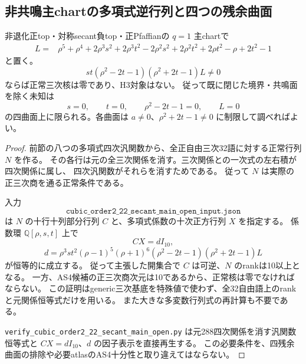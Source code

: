 \subsection{非共鳴主chartの多項式逆行列と四つの残余曲面}
\begin{proposition}
非退化正top・対称secant負top・正Pfaffianの $q=1$ 主chartで
\begin{align*}
 L={}&\rho^5+\rho^4+2\rho^3s^2+2\rho^3t^2-2\rho^2s^2
       +2\rho^2t^2+2\rho t^2-\rho+2t^2-1
\end{align*}
と置く。
\[
 s t(\rho^2-2t-1)(\rho^2+2t-1)L\ne0
\]
ならば正常三次核は零であり、H3対象はない。
従って既に閉じた境界・共鳴面を除く未知は
\[
 s=0,\qquad t=0,\qquad\rho^2-2t-1=0,\qquad L=0
\]
の四曲面上に限られる。各曲面は $a\ne0$、$\rho^2+2t-1\ne0$ に制限して調べればよい。
\end{proposition}
\begin{proof}
前節の八つの多項式四次汎関数から、全正自由三次32語に対する正常行列 $N$ を作る。
その各行は元の全三次関係を消す。三次関係との一次式の左右積が四次関係に属し、
四次汎関数がそれらを消すためである。
従って $N$ は実際の正三次商を通る正常条件である。

入力
\[
 \texttt{cubic\_order2\_22\_secant\_main\_open\_input.json}
\]
は $N$ の十行十列部分行列 $C$ と、多項式係数の十次正方行列 $X$ を指定する。
係数環 $\mathbb Q[\rho,s,t]$ 上で
\[
 C X=dI_{10},
\]
\[
 d=\rho^3 s t^2(\rho-1)^5(\rho+1)^6
       (\rho^2-2t-1)(\rho^2+2t-1)L
\]
が恒等的に成立する。
従って主張した開集合で $C$ は可逆、$N$ のrankは10以上となる。
一方、AS4候補の正三次商次元は10であるから、正常核は零でなければならない。
この証明はgeneric三次基底を特殊値で使わず、全32自由語上のrankと元関係恒等式だけを用いる。
また大きな多変数行列式の再計算も不要である。

\texttt{verify\_cubic\_order2\_22\_secant\_main\_open.py}
は元288四次関係を消す汎関数恒等式と $CX=dI_{10}$、$d$ の因子表示を直接再生する。
この必要条件を、四残余曲面の排除や必要atlasのAS4十分性と取り違えてはならない。
\end{proof}
